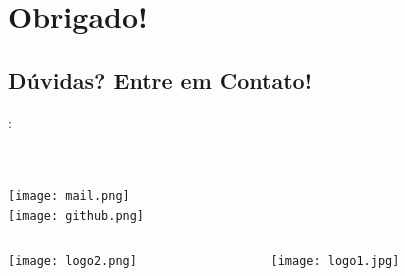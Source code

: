 \section*{Obrigado!}
\label{sec:obrigado}

\subsection*{Dúvidas? Entre em Contato!}
\begin{frame}
	\begin{block}{}
		\begin{center}
			\textbf{\mysubject}: \\[2ex] \mytitle\\[1ex]
		\end{center}
	\end{block}
	
	\vspace{1ex}
	
	\begin{center}
		\myauthor \\[4ex]          	
		 \texttt{[image: mail.png]}\textcolor{white}{-} \myauthoremail \\
		 \texttt{[image: github.png]}\textcolor{white}{-}\myauthorgit \\[4ex]
	\end{center}	
	
	\begin{columns}[T]
		\begin{column}[T]{2cm}		
			\texttt{[image: logo2.png]}\centering
		\end{column}
		\begin{column}[T]{2cm}	
			\texttt{[image: logo1.jpg]}\centering	
		\end{column}
	\end{columns}
	
	\vspace{3ex}
\end{frame}